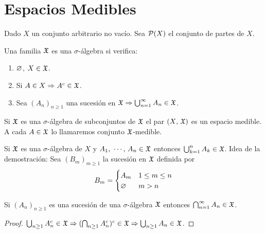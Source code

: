 \clearpage

\section{Espacios Medibles}

Dado $X$ un conjunto arbitrario no vacío. Sea $\mathcal{P}(X)$ el conjunto de partes de $X$.

\begin{definition}
    Una familia $\mathfrak{X}$ es una $\sigma$-álgebra si verifica:
    \begin{enumerate}
        \item $\varnothing$, $X \in \mathfrak{X}$.
        \item Si $A \in X \Rightarrow A^c \in \mathfrak{X}$.
        \item Sea $(A_n)_{n \geq 1}$ una sucesión en $\mathfrak{X} \Rightarrow \bigcup_{n=1}^{\infty} A_n \in \mathfrak{X}$.
    \end{enumerate}
\end{definition}

\begin{definition}
    Si $\mathfrak{X}$ es una $\sigma$-álgebra de subconjuntos de $\mathfrak{X}$ el par $(X\text{, }\mathfrak{X})$ es un espacio medible. A cada $A \in \mathfrak{X}$
    lo llamaremos conjunto $\mathfrak{X}$-medible.
\end{definition}

\begin{note}
    Si $\mathfrak{X}$ es una $\sigma$-álgebra de $X$ y $A_1 \text{, } \cdots \text{, } A_n \in \mathfrak{X}$ entonces $\bigcup_{k=1}^{n} A_k \in \mathfrak{X}$.
    Idea de la demostración: Sea $(B_m)_{m \geq 1}$ la sucesión en $\mathfrak{X}$ definida por \begin{equation*}
        B_m = \begin{cases}
            A_m & 1 \leq m \leq n \\
            \varnothing  & m > n
        \end{cases}
    \end{equation*}
\end{note}

\begin{note}
    Si $(A_n)_{n \geq 1}$ es una sucesión de una $\sigma$-álgebra $\mathfrak{X}$ entonces $\bigcap_{n=1}^{\infty} A_n \in \mathfrak{X}$.
    \begin{proof}
        $\bigcup_{n \geq 1} A_n^c \in \mathfrak{X} \Rightarrow (\bigcap_{n \geq 1} A_n^c)^c \in \mathfrak{X} \Rightarrow \bigcup_{n \geq 1} A_n \in \mathfrak{X}$.
    \end{proof}
\end{note}

